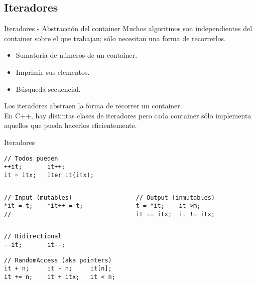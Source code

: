 \subsection{Iteradores}
\begin{frame}[fragile]{Iteradores - Abstracci\'on del container}
Muchos algoritmos son independientes del container sobre el que trabajan; s\'olo 
necesitan una forma de recorrerlos.
   \pause
   \begin{itemize}
      \item Sumatoria de n\'umeros de un container.
      \item Imprimir sus elementos.
      \item B\'usqueda secuencial.
   \end{itemize}
   \pause
\vphantom{X}
Los iteradores abstraen la forma de recorrer un container.\\
En C++, hay distintas clases de iteradores pero cada container s\'olo implementa aquellos que pueda hacerlos \alert{eficientemente}.
\end{frame}
\begin{frame}[fragile]{Iteradores}
         \begin{lstlisting}[style=normal,xleftmargin=.3\textwidth,xrightmargin=.2\textwidth]
// Todos pueden
++it;       it++;
it = itx;   Iter it(itx);
         \end{lstlisting}
\pause
   \begin{columns}[t]
      \begin{column}{.4\linewidth}
         \begin{lstlisting}[style=normal,firstnumber=4]
// Input (mutables)
*it = t;    *it++ = t;
//
         \end{lstlisting}
      \end{column}
      \begin{column}{.4\linewidth}
\pause
         \begin{lstlisting}[style=normal,firstnumber=4]
// Output (inmutables)
t = *it;    it->m;
it == itx;  it != itx;
         \end{lstlisting}
      \end{column}
   \end{columns}
\pause
         \begin{lstlisting}[style=normal,xleftmargin=.3\textwidth,xrightmargin=.2\textwidth,firstnumber=last]
// Bidirectional
--it;       it--;
         \end{lstlisting}
\pause
         \begin{lstlisting}[style=normal,xleftmargin=.2\textwidth,xrightmargin=.2\textwidth,firstnumber=last]
// RandomAccess (aka pointers)
it + n;     it - n;     it[n];
it += n;    it + itx;   it < n;
         \end{lstlisting}
\end{frame}
